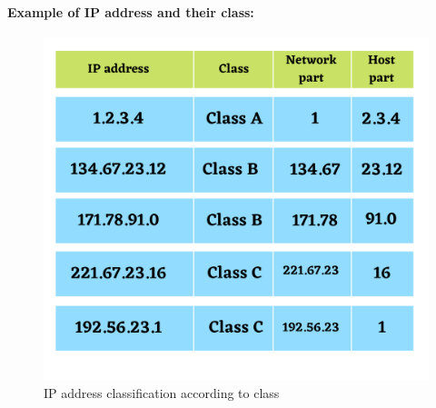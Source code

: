\begin{flushleft}
\paragraph{Example of IP address and their class:}
\begin{figure}[h!]
	\centering
	\includegraphics[scale=.3]{content/chapter14/images/ip_example.png}
	\caption{IP address classification according to class }
	\label{fig:type}
\end{figure}	




\end{flushleft}
\newpage